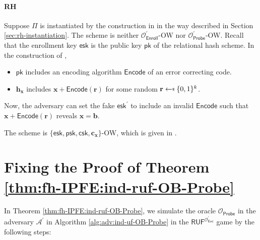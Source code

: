 \paragraph{RH}

Suppose $\Pi$ is instantiated by the construction in \cite{cryptoeprint:2014/394} in the way described in Section \ref{sec:rh-instantiation}. The scheme is neither $\mathcal{O}_{\textsf{Enroll}}^\prime$-OW nor $\mathcal{O}_{\textsf{Probe}}^\prime$-OW. Recall that the enrollment key $\textsf{esk}$ is the public key $\textsf{pk}$ of the relational hash scheme. In the construction of \cite{cryptoeprint:2014/394},
\begin{itemize}
	\item $\textsf{pk}$ includes an encoding algorithm $\textsf{Encode}$ of an error correcting code.
	\item $\mathbf{h_x}$ includes $\mathbf{x} + \textsf{Encode}(\mathbf{r})$ for some random $\mathbf{r} \getsdollar \{0,1\}^k$.
\end{itemize}
Now, the adversary can set the fake $\textsf{esk}^\prime$ to include an invalid $\textsf{Encode}$ such that $\mathbf{x} + \textsf{Encode}(\mathbf{r})$ reveals $\mathbf{x} = \mathbf{b}$. 

The scheme is $\{ \textsf{esk}, \textsf{psk}, \textsf{csk}, \mathbf{c_x} \}$-OW, which is given in \cite[Theorem 4]{cryptoeprint:2014/394}.


\newpage


\section{Fixing the Proof of Theorem \ref{thm:fh-IPFE:ind-ruf-OB-Probe}}

In Theorem \ref{thm:fh-IPFE:ind-ruf-OB-Probe}, we simulate the oracle $\mathcal{O}_{\textsf{Probe}}$ in the adversary $\mathcal{A}^\prime$ in Algorithm \ref{alg:adv:ind-uf-OB-Probe} in the $\textsf{RUF}^{ \mathcal{O}^\prime_{\textsf{Enc}} }$ game by the following steps:

